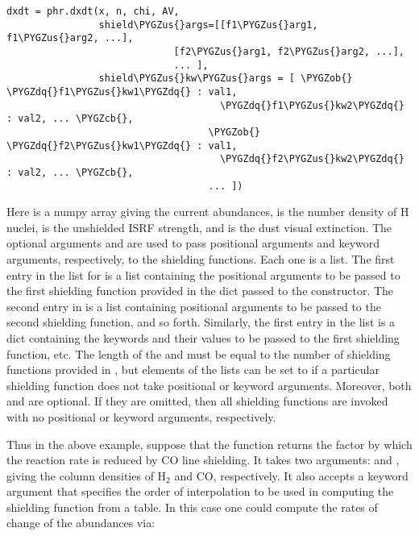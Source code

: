 \documentclass[letterpaper,10pt,english]{sphinxmanual}
\def\PYGZus{\char`\_}
\def\PYGZob{\char`\{}
\def\PYGZcb{\char`\}}
\def\PYGZdq{\char`\"}
\begin{document}
\begin{Verbatim}[commandchars=\\\{\}]
dxdt = phr.dxdt(x, n, chi, AV,
                shield\PYGZus{}args=[[f1\PYGZus{}arg1, f1\PYGZus{}arg2, ...],
                             [f2\PYGZus{}arg1, f2\PYGZus{}arg2, ...],
                             ... ],
                shield\PYGZus{}kw\PYGZus{}args = [ \PYGZob{} \PYGZdq{}f1\PYGZus{}kw1\PYGZdq{} : val1,
                                     \PYGZdq{}f1\PYGZus{}kw2\PYGZdq{} : val2, ... \PYGZcb{},
                                   \PYGZob{} \PYGZdq{}f2\PYGZus{}kw1\PYGZdq{} : val1,
                                     \PYGZdq{}f2\PYGZus{}kw2\PYGZdq{} : val2, ... \PYGZcb{},
                                   ... ])
\end{Verbatim}

Here  is a numpy array giving the current abundances,  is
the number density of H nuclei,  is the unshielded ISRF
strength, and  is the dust visual extinction. The optional
arguments  and  are used to pass
positional arguments and keyword arguments, respectively, to the
shielding functions. Each one is a list. The first entry in the list
for  is a list containing the positional arguments to
be passed to the first shielding function provided in the
 dict passed to the constructor. The second entry in
 is a list containing positional arguments to be passed
to the second shielding function, and so forth. Similarly, the
first entry in the  list is a dict containing the
keywords and their values to be passed to the first shielding
function, etc. The length of the  and
 must be equal to the number of shielding functions
provided in , but elements of the lists can be set to
 if a particular shielding function does not take positional
or keyword arguments. Moreover, both  and
 are optional. If they are omitted, then all
shielding functions are invoked with no positional or keyword
arguments, respectively.

Thus in the above example, suppose that the function 
returns the factor by which the reaction rate is reduced by CO line
shielding. It takes two arguments:  and , giving the
column densities of \(\mathrm{H}_2\) and \(\mathrm{CO}\),
respectively. It also accepts a keyword argument  that
specifies the order of interpolation to be used in computing the
shielding function from a table. In this case one could compute the
rates of change of the abundances via:
\end{document}

